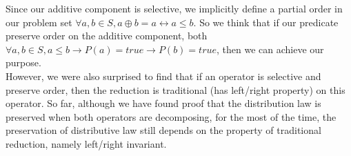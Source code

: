 \documentclass[a4paper,10pt]{article}
\begin{document}
Since our additive component is selective, we implicitly define a partial order in our problem set $\forall a,b \in S, a \oplus b = a \longleftrightarrow a \leq b$. 
So we think that if our predicate preserve order on the additive component, both $\forall a,b \in S, a \leq b \rightarrow P(a) = true \rightarrow P(b) = true$, then we can achieve our purpose.\\
However, we were also surprised to find that if an operator is selective and preserve order, then the reduction is traditional (has left/right property) on this operator.
So far, although we have found proof that the distribution law is preserved when both operators are decomposing, for the most of the time, the preservation of distributive law still depends on the property of traditional reduction, namely left/right invariant.\\\\
\end{document}
